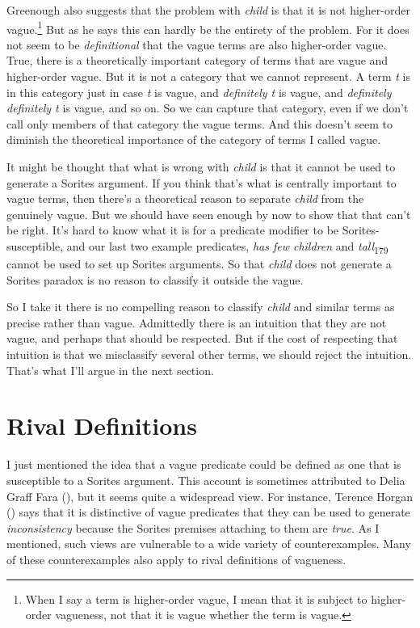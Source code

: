 \documentclass[
  10pt,
  letterpaper,
  DIV=11,
  numbers=noendperiod,
  twoside]{scrartcl}
\begin{document}
Greenough also suggests that the problem with \emph{child} is that it is
not higher-order vague.\footnote{When I say a term is higher-order
  vague, I mean that it is subject to higher-order vagueness, not that
  it is vague whether the term is vague.} But as he says this can hardly
be the entirety of the problem. For it does not seem to be
\emph{definitional} that the vague terms are also higher-order vague.
True, there is a theoretically important category of terms that are
vague and higher-order vague. But it is not a category that we cannot
represent. A term \emph{t} is in this category just in case \emph{t} is
vague, and \emph{definitely t} is vague, and \emph{definitely definitely
t} is vague, and so on. So we can capture that category, even if we
don't call only members of that category the vague terms. And this
doesn't seem to diminish the theoretical importance of the category of
terms I called vague.

It might be thought that what is wrong with \emph{child} is that it
cannot be used to generate a Sorites argument. If you think that's what
is centrally important to vague terms, then there's a theoretical reason
to separate \emph{child} from the genuinely vague. But we should have
seen enough by now to show that that can't be right. It's hard to know
what it is for a predicate modifier to be Sorites-susceptible, and our
last two example predicates, \emph{has few children} and
\emph{tall}\textsubscript{179} cannot be used to set up Sorites
arguments. So that \emph{child} does not generate a Sorites paradox is
no reason to classify it outside the vague.

So I take it there is no compelling reason to classify \emph{child} and
similar terms as precise rather than vague. Admittedly there is an
intuition that they are not vague, and perhaps that should be respected.
But if the cost of respecting that intuition is that we misclassify
several other terms, we should reject the intuition. That's what I'll
argue in the next section.

\section{Rival Definitions}\label{sec-greenough}

I just mentioned the idea that a vague predicate could be defined as one
that is susceptible to a Sorites argument. This account is sometimes
attributed to Delia Graff Fara (), but it
seems quite a widespread view. For instance, Terence Horgan
() says that it is distinctive of vague
predicates that they can be used to generate \emph{inconsistency}
because the Sorites premises attaching to them are \emph{true}. As I
mentioned, such views are vulnerable to a wide variety of
counterexamples. Many of these counterexamples also apply to rival
definitions of vagueness.
\end{document}
